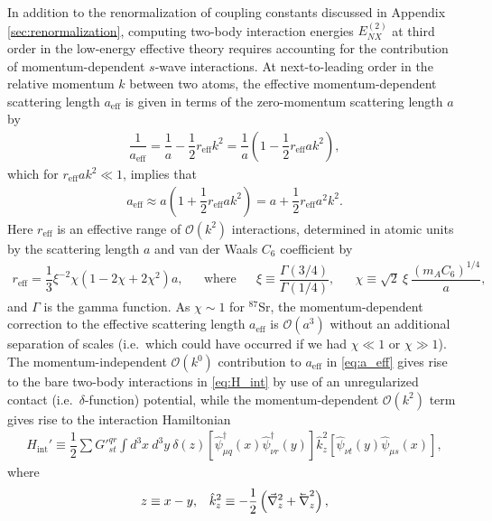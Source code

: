 \documentclass[preprint,showkeys,nofootinbib]{revtex4-1}
\renewcommand{\t}{\text} %
\newcommand{\f}{\dfrac} %
\newcommand{\p}[1]{\left(#1\right)} %
\renewcommand{\sp}[1]{\left[#1\right]} %
\renewcommand{\O}{\mathcal{O}}
\newcommand{\1}{\mathds{1}}
\newcommand{\lvec}[1]
{\reflectbox{\ensuremath{\vec{\reflectbox{\ensuremath{#1}}}}}}
\begin{document}
In addition to the renormalization of coupling constants discussed in
Appendix \ref{sec:renormalization}, computing two-body interaction
energies $E_{NX}^{(2)}$ at third order in the low-energy effective
theory requires accounting for the contribution of momentum-dependent
$s$-wave interactions.  At next-to-leading order in the relative
momentum $k$ between two atoms, the effective momentum-dependent
scattering length $a_{\t{eff}}$ is given in terms of the zero-momentum
scattering length $a$ by \cite{blume2002fermi, chin2010feshbach}
\begin{align}
  \f1{a_{\t{eff}}}
  = \f1a - \f12 r_{\t{eff}} k^2
  = \f1a\p{1 - \f12 r_{\t{eff}} a k^2},
\end{align}
which for $r_{\t{eff}} a k^2 \ll 1$, implies that
\begin{align}
  a_{\t{eff}}
  \approx a\p{1 + \f12 r_{\t{eff}} a k^2}
  = a + \f12 r_{\t{eff}} a^2 k^2.
  \label{eq:a_eff}
\end{align}
Here $r_{\t{eff}}$ is an effective range of $\O\p{k^2}$ interactions,
determined in atomic units by the scattering length $a$ and van der
Waals $C_6$ coefficient by \cite{flambaum1999analytical}
\begin{align}
  r_{\t{eff}} = \f13 \xi^{-2} \chi \p{1 - 2\chi + 2\chi^2} a,
  &&
  \t{where}
  &&
  \xi \equiv \f{\Gamma\p{3/4}}{\Gamma\p{1/4}},
  &&
  \chi \equiv \sqrt{2}~ \xi~ \f{\p{m_AC_6}^{1/4}}{a},
  \label{eq:effective_range}
\end{align}
and $\Gamma$ is the gamma function.  As $\chi\sim1$ for ${}^{87}$Sr,
the momentum-dependent correction to the effective scattering length
$a_{\t{eff}}$ is $\O\p{a^3}$ without an additional separation of
scales (i.e.~which could have occurred if we had $\chi\ll1$ or
$\chi\gg1$).  The momentum-independent $\O\p{k^0}$ contribution to
$a_{\t{eff}}$ in \eqref{eq:a_eff} gives rise to the bare two-body
interactions in \eqref{eq:H_int} by use of an unregularized contact
(i.e.~$\delta$-function) potential, while the momentum-dependent
$\O\p{k^2}$ term gives rise to the interaction Hamiltonian
\cite{blume2002fermi, johnson2012effective}
\begin{align}
  H_{\t{int}}'
  \equiv \f12 \sum {G'}^{qr}_{st} \int d^3 x~d^3y~\delta\p{z}
  \sp{\hat\psi_{\mu q}^\dag\p{x} \hat\psi_{\nu r}^\dag\p{y}}
  \hat k_z^2\sp{\hat\psi_{\nu t}\p{y} \hat\psi_{\mu s}\p{x}},
  \label{eq:H_int_primed}
\end{align}
where
\begin{align}
  z \equiv x - y,
  &&
  \hat k_z^2
  \equiv -\f12 \p{\vec\nabla_z^2 + \lvec\nabla_z^2},
\end{align}
\end{document}
